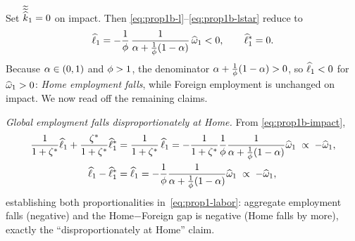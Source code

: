 Set $\widetilde{\widetilde{\widehat{k}}}_1=0$ on impact. Then
\eqref{eq:prop1b-l}--\eqref{eq:prop1b-lstar} reduce to
\begin{equation}
\widehat{\ell}_1 = -\frac{1}{\phi}\,\frac{1}{\alpha+\frac{1}{\phi}(1-\alpha)}\,\widehat{\omega}_1 < 0,
\qquad \widehat{\ell}^{*}_1 = 0. \label{eq:prop1b-impact}
\end{equation}
Because $\alpha\in(0,1)$ and $\phi>1$, the denominator
$\alpha+\frac{1}{\phi}(1-\alpha)>0$, so $\widehat{\ell}_1<0$ for $\widehat{\omega}_1>0$:
\emph{Home employment falls}, while Foreign employment is unchanged on impact.
We now read off the remaining claims.

\emph{Global employment falls disproportionately at Home.} From
\eqref{eq:prop1b-impact},
\begin{align}
\frac{1}{1+\zeta^{*}}\widehat{\ell}_1+\frac{\zeta^{*}}{1+\zeta^{*}}\widehat{\ell}^{*}_1
&= \frac{1}{1+\zeta^{*}}\,\widehat{\ell}_1
= -\frac{1}{1+\zeta^{*}}\frac{1}{\phi}\frac{1}{\alpha+\frac{1}{\phi}(1-\alpha)}\widehat{\omega}_1 \;\propto\; -\widehat{\omega}_1, \\
\widehat{\ell}_1-\widehat{\ell}^{*}_1 &= \widehat{\ell}_1
= -\frac{1}{\phi}\frac{1}{\alpha+\frac{1}{\phi}(1-\alpha)}\widehat{\omega}_1 \;\propto\; -\widehat{\omega}_1,
\end{align}
establishing both proportionalities in~\eqref{eq:prop1-labor}: aggregate
employment falls (negative) and the Home$-$Foreign gap is negative (Home falls
by more), exactly the ``disproportionately at Home'' claim.

